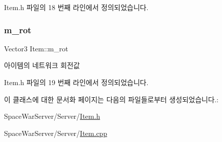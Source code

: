 Item.\+h 파일의 18 번째 라인에서 정의되었습니다.

\mbox{\label{class_item_a8442ba52568d84d584117ed8e4f11883}} 
\subsubsection{\texorpdfstring{m\+\_\+rot}{m\_rot}}
{\footnotesize\ttfamily Vector3 Item\+::m\+\_\+rot\hspace{0.3cm}{\ttfamily [private]}}



아이템의 네트워크 회전값 



Item.\+h 파일의 19 번째 라인에서 정의되었습니다.



이 클래스에 대한 문서화 페이지는 다음의 파일들로부터 생성되었습니다.\+:\begin{DoxyCompactItemize}
\item 
Space\+War\+Server/\+Server/\hyperlink{_item_8h}{Item.\+h}\item 
Space\+War\+Server/\+Server/\hyperlink{_item_8cpp}{Item.\+cpp}\end{DoxyCompactItemize}

